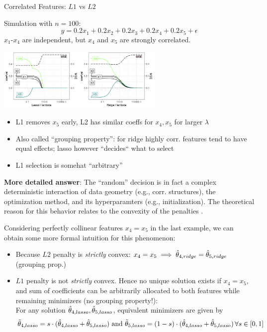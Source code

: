 \documentclass[11pt,compress,t,notes=noshow, xcolor=table]{beamer}
\begin{document}
\begin{vbframe}{Correlated Features: $L1$ vs $L2$}


Simulation with $n=100$: 
$$y = 0.2x_1 + 0.2x_2 + 0.2x_3 + 0.2x_4 + 0.2x_5 + \epsilon$$
$x_1$-$x_4$ are independent, but $x_4$ and $x_5$ are strongly correlated.

\begin{center}
\includegraphics[width=0.6\textwidth]{figure/regu_example_multicollinearity.png}
\end{center}


\begin{itemize}
\item L1 removes $x_5$ early, L2 has similar coeffs for $x_4, x_5$ for larger $\lambda$
\item Also called ``grouping property'': for ridge highly corr. features tend to have equal effects; lasso however ``decides`` what to select
\item L1 selection is somehat ``arbitrary''
\end{itemize}

\framebreak

\textbf{More detailed answer}: The ``random'' decision is in fact a complex deterministic interaction of data geometry (e.g., corr. structures), the optimization method, and its hyperparamters (e.g., initialization). The theoretical reason for this behavior relates to the convexity of the penalties .

\vspace{0.1cm}

Considering perfectly collinear features $x_4=x_5$ in the last example, we can obtain some more formal intuition for this phenomenon:
\vspace{0.15cm}
\begin{itemize}
    \item Because $L2$ penalty is \textit{strictly} convex: $x_4=x_5 \implies \hat{\theta}_{4, ridge}=\hat{\theta}_{5, ridge}$ (grouping prop.)
    \item $L1$ penalty is not \textit{strictly} convex. Hence no unique solution exists if $x_4=x_5$, and sum of coefficients can be arbitrarily allocated to both features while remaining minimizers (no grouping property!):\\
    For any solution $\hat{\theta}_{4,lasso},\hat{\theta}_{5,lasso}$, equivalent minimizers are given by 
    {\small $$\Tilde{\theta}_{4,lasso}=s\cdot(\hat{\theta}_{4,lasso}+\hat{\theta}_{5,lasso}) \,\,\text{and}\,\,\Tilde{\theta}_{5,lasso}=(1-s)\cdot(\hat{\theta}_{4,lasso}+\hat{\theta}_{5,lasso})\,\forall s\in[0,1]$$}
\end{itemize}


\end{vbframe}
\end{document}
